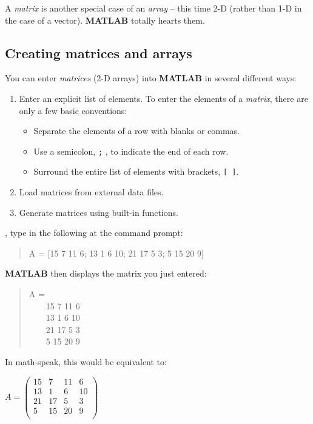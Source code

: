 \documentclass{tufte-book} %
\newenvironment{docspec}{\begin{quotation}\ttfamily\parskip0pt\parindent0pt\ignorespaces}{\end{quotation}}
\begin{document}
A \textit{matrix} is another special case of an \textit{array} -- this time 2-D (rather than 1-D in the case of a vector). \textbf{MATLAB} totally hearts them.
 
\subsection{Creating matrices and arrays}

You can enter \textit{matrices} (2-D arrays) into \textbf{MATLAB} in several different ways:

\begin{enumerate}[noitemsep]
\setlength{\itemindent}{.2in}
\item Enter an explicit list of elements.
To enter the elements of a \textit{matrix}, there are only a few basic conventions:
\begin{itemize}[noitemsep]
\setlength{\itemindent}{.4in}
\item Separate the elements of a row with blanks or commas.
\item Use a semicolon, \texttt{;} , to indicate the end of each row.
\item Surround the entire list of elements with  brackets, \texttt{[ ]}.
\end{itemize}
\item Load matrices from external data files.
\item Generate matrices using built-in functions.
\end{enumerate}

, type in the following at the command prompt:
\begin{docspec}
A = [15 7 11 6; 13 1 6 10; 21 17 5 3; 5 15 20 9]
\end{docspec}
\noindent \textbf{MATLAB} then displays the matrix you just entered:
\begin{docspec}
A =\\
\ \ \ \ 15   7  11   6\\
\ \ \ \ 13   1   6  10\\
\ \ \ \ 21  17   5   3\\
\ \ \ \ 5   15  20   9
\end{docspec}

In math-speak, this would be equivalent to:

\vspace{2mm}
\(A=\begin{pmatrix}15 & 7 & 11 & 6 \\
13 & 1 & 6 & 10 \\
21 & 17 & 5 & 3 \\
5 & 15 & 20 & 9 \\
\end{pmatrix}\)
\vspace{2mm}
\end{document}
